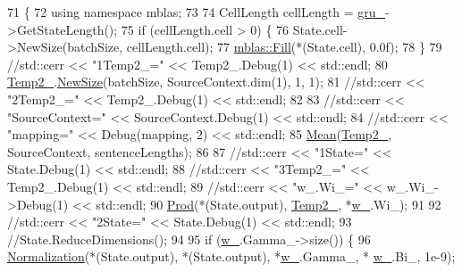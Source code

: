 \begin{DoxyCode}
71         \{
72           \textcolor{keyword}{using namespace }mblas;
73 
74           CellLength cellLength = \hyperlink{classamunmt_1_1GPU_1_1Decoder_1_1RNNHidden_adb4c82513eebad0bf15fc30e80a773c5}{gru\_}->GetStateLength();
75           \textcolor{keywordflow}{if} (cellLength.cell > 0) \{
76             State.cell->NewSize(batchSize, cellLength.cell);
77             \hyperlink{namespaceamunmt_1_1GPU_1_1mblas_aae3149752683fc6c3d719c495c161cbc}{mblas::Fill}(*(State.cell), 0.0f);
78           \}
79           \textcolor{comment}{//std::cerr << "1Temp2\_=" << Temp2\_.Debug(1) << std::endl;}
80           \hyperlink{classamunmt_1_1GPU_1_1Decoder_1_1RNNHidden_a19dc15b3feae837ac18e9014cffc4a9d}{Temp2\_}.\hyperlink{classamunmt_1_1GPU_1_1mblas_1_1TMatrix_a379c5cc8ef7ca2f71da2d5055c9fb542}{NewSize}(batchSize, SourceContext.dim(1), 1, 1);
81           \textcolor{comment}{//std::cerr << "2Temp2\_=" << Temp2\_.Debug(1) << std::endl;}
82 
83           \textcolor{comment}{//std::cerr << "SourceContext=" << SourceContext.Debug(1) << std::endl;}
84           \textcolor{comment}{//std::cerr << "mapping=" << Debug(mapping, 2) << std::endl;}
85           \hyperlink{namespaceamunmt_1_1GPU_1_1mblas_ae4b56d534b95189bf183d6008e2d7e45}{Mean}(\hyperlink{classamunmt_1_1GPU_1_1Decoder_1_1RNNHidden_a19dc15b3feae837ac18e9014cffc4a9d}{Temp2\_}, SourceContext, sentenceLengths);
86 
87           \textcolor{comment}{//std::cerr << "1State=" << State.Debug(1) << std::endl;}
88           \textcolor{comment}{//std::cerr << "3Temp2\_=" << Temp2\_.Debug(1) << std::endl;}
89           \textcolor{comment}{//std::cerr << "w\_.Wi\_=" << w\_.Wi\_->Debug(1) << std::endl;}
90           \hyperlink{namespaceamunmt_1_1GPU_1_1mblas_a463b2de180e8ab66bae53d1f8c5bc011}{Prod}(*(State.output), \hyperlink{classamunmt_1_1GPU_1_1Decoder_1_1RNNHidden_a19dc15b3feae837ac18e9014cffc4a9d}{Temp2\_}, *\hyperlink{classamunmt_1_1GPU_1_1Decoder_1_1RNNHidden_a96f70b0f258c493213bccb861f0014d0}{w\_}.Wi\_);
91 
92           \textcolor{comment}{//std::cerr << "2State=" << State.Debug(1) << std::endl;}
93           \textcolor{comment}{//State.ReduceDimensions();}
94 
95           \textcolor{keywordflow}{if} (\hyperlink{classamunmt_1_1GPU_1_1Decoder_1_1RNNHidden_a96f70b0f258c493213bccb861f0014d0}{w\_}.Gamma\_->size()) \{
96             \hyperlink{namespaceamunmt_1_1GPU_1_1mblas_ae50f34596c0fcc0aa93e717edcd66379}{Normalization}(*(State.output), *(State.output), *\hyperlink{classamunmt_1_1GPU_1_1Decoder_1_1RNNHidden_a96f70b0f258c493213bccb861f0014d0}{w\_}.Gamma\_, *
      \hyperlink{classamunmt_1_1GPU_1_1Decoder_1_1RNNHidden_a96f70b0f258c493213bccb861f0014d0}{w\_}.Bi\_, 1e-9);

\end{DoxyCode}
